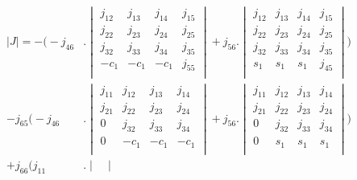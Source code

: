 \begin{align}
    |J| = -\Bigg(-j_{46}&.\begin{vmatrix}
                        j_{12} & j_{13} & j_{14} & j_{15} \\
                        j_{22} & j_{23} & j_{24} & j_{25} \\
                        j_{32} & j_{33} & j_{34} & j_{35} \\
                        -c_1 & -c_1 & -c_1 & j_{55} \\
                    \end{vmatrix} + j_{56}.\begin{vmatrix}
                                            j_{12} & j_{13} & j_{14} & j_{15} \\
                                            j_{22} & j_{23} & j_{24} & j_{25} \\
                                            j_{32} & j_{33} & j_{34} & j_{35} \\
                                            s_1 & s_1 & s_1 & j_{45} \\
                                        \end{vmatrix} \Bigg) \nonumber \\
    - j_{65}\Bigg(-j_{46}&.\begin{vmatrix}
                        j_{11} & j_{12} & j_{13} & j_{14} \\
                        j_{21} & j_{22} & j_{23} & j_{24} \\
                        0   & j_{32} & j_{33} & j_{34} \\
                        0   & -c_1 & -c_1 & -c_1 \\        
                    \end{vmatrix} + j_{56}.\begin{vmatrix}
                                            j_{11} & j_{12} & j_{13} & j_{14} \\
                                            j_{21} & j_{22} & j_{23} & j_{24} \\
                                            0   & j_{32} & j_{33} & j_{34} \\
                                            0   & s_1 & s_1 & s_1 \\                
                                        \end{vmatrix} \Bigg) \nonumber \\
    + j_{66}\Bigg(j_{11}&.\begin{vmatrix}

\end{vmatrix}
\end{align}
